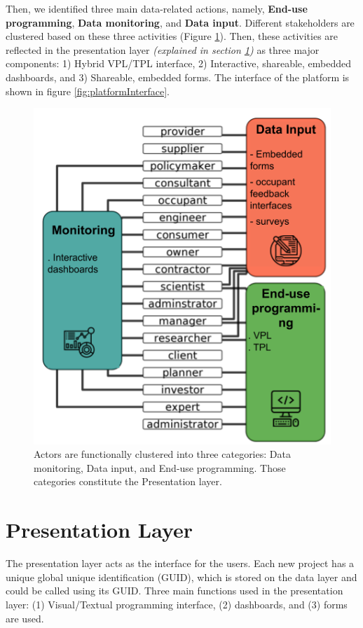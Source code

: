 \documentclass{scsSimAUDPaperFormat}
\begin{document}
{Then, we identified three main data-related actions, namely, \textbf{End-use programming}, \textbf{Data monitoring}, and \textbf{Data input}. Different stakeholders are clustered based on these three activities (Figure \ref{fig:figure6}). Then, these activities are reflected in the presentation layer \textit{(explained in section \ref{sec:presentationLayer})}  as three major components: 1) Hybrid VPL/TPL interface, 2) Interactive, shareable, embedded dashboards, and 3) Shareable, embedded forms. The interface of the platform is shown in figure \ref{fig:platformInterface}.}

\begin{figure}[h]
\centering
\includegraphics[width=0.8\columnwidth]{imgs/presentation_layer.png}
\caption{Actors are functionally clustered into three categories: Data monitoring, Data input, and End-use programming. Those categories constitute the Presentation layer.}
\label{fig:figure6}
\end{figure}

\section{Presentation Layer}
\label{sec:presentationLayer}
The presentation layer acts as the interface for the users. Each new project has a unique global unique identification (GUID), which is stored on the data layer and could be called using its GUID. Three main functions used in the presentation layer: (1) Visual/Textual programming interface, (2) dashboards, and (3) forms are used.
\end{document}
